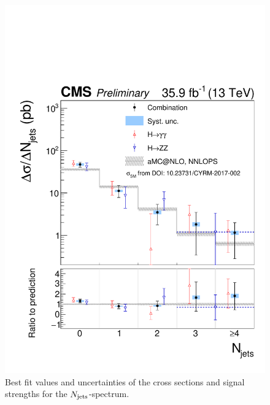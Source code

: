 \begin{figure}[hbtp]
  \begin{center}
    \includegraphics[width=\cmsFigWidth]{img/resultsapproval/reworked/spectra_njets.pdf}
    \caption{
        Best fit values and uncertainties of the cross sections and signal strengths for the $N_\text{jets}$-spectrum.
        }
    \label{fig:CombinedSpectra_njets}
  \end{center}
\end{figure}


